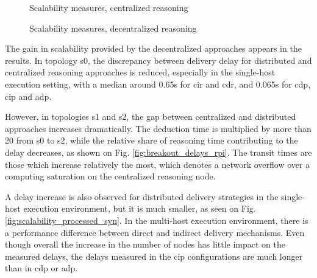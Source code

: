 \documentclass{iosart2c}
\begin{document}
\begin{figure}
	\caption{Scalability measures, centralized reasoning}
	\label{fig:factory_scala_processed}
	\Centering
	\label{fig:factory_scala_raw_rpi}
	\scalebox{1}{
		
	}
\end{figure}

\begin{figure}
	\caption{Scalability measures, decentralized reasoning}
	\vfill
	\noindent
	
	\begin{minipage}{0.33\textwidth}
		\Centering
		\label{fig:scalability_processed_rpi}
		\scalebox{0.9}{
			
		}
	\end{minipage}
	\begin{minipage}{0.33\textwidth}
		\Centering
		\label{fig:scalability_processed_rpi2}
		\scalebox{0.9}{
			
		}
	\end{minipage}
	\begin{minipage}{0.329\textwidth}
		\Centering
		\label{fig:factory_scala_cip_rpi2}
		\scalebox{0.9}{
			
		}
	\end{minipage}
\end{figure}

The gain in scalability provided by the decentralized approaches appears in the results. 
In topology s0, the discrepancy between delivery delay for distributed and centralized reasoning approaches is reduced, especially in the single-host execution setting, with a median around 0.65s for \gls{cir} and \gls{cdr}, and 0.065s for \gls{cdp}, \gls{cip} and \gls{adp}.

However, in topologies s1 and s2, the gap between centralized and distributed approaches increases dramatically. 
The deduction time is multiplied by more than 20 from s0 to s2, while the relative share of reasoning time contributing to the delay decreases, as shown on Fig. \ref{fig:breakout_delays_rpi}.
The transit times are those which increase relatively the most, which denotes a network overflow over a computing saturation on the centralized reasoning node.

A delay increase is also observed for distributed delivery strategies in the single-host execution environment, but it is much smaller, as seen on Fig. \ref{fig:scalability_processed_syn}.
In the multi-host execution environment, there is a performance difference between direct and indirect delivery mechanisms.
Even though overall the increase in the number of nodes has little impact on the measured delays, the delays measured in the \gls{cip} configurations are much longer than in \gls{cdp} or \gls{adp}. 
\end{document}

